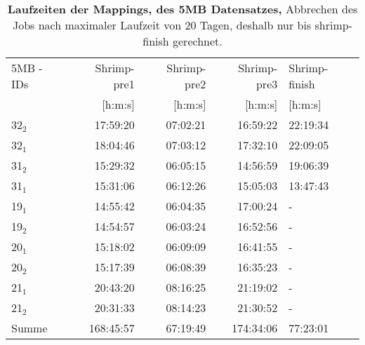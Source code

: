 \documentclass{scrartcl}
\begin{document}
\begin{table}[!h]
\caption[Laufzeiten der Mappings, des 5MB Datensatzes]{\textbf{Laufzeiten der Mappings, des 5MB Datensatzes,} Abbrechen des Jobs nach maximaler Laufzeit von 20 Tagen, deshalb nur bis shrimp-finish gerechnet.}

\begin{center}
\begin{tabular}{lrrrl}
5MB - IDs & Shrimp-pre1 & Shrimp-pre2 & Shrimp-pre3 & Shrimp-finish\\
 & [h:m:s] & [h:m:s] & [h:m:s] & [h:m:s]\\
\hline
32$_{\text{2}}$ & 17:59:20 & 07:02:21 & 16:59:22 & 22:19:34\\
32$_{\text{1}}$ & 18:04:46 & 07:03:12 & 17:32:10 & 22:09:05\\
31$_{\text{2}}$ & 15:29:32 & 06:05:15 & 14:56:59 & 19:06:39\\
31$_{\text{1}}$ & 15:31:06 & 06:12:26 & 15:05:03 & 13:47:43\\
19$_{\text{1}}$ & 14:55:42 & 06:04:35 & 17:00:24 & -\\
19$_{\text{2}}$ & 14:54:57 & 06:03:24 & 16:52:56 & -\\
20$_{\text{1}}$ & 15:18:02 & 06:09:09 & 16:41:55 & -\\
20$_{\text{2}}$ & 15:17:39 & 06:08:39 & 16:35:23 & -\\
21$_{\text{1}}$ & 20:43:20 & 08:16:25 & 21:19:02 & -\\
21$_{\text{2}}$ & 20:31:33 & 08:14:23 & 21:30:52 & -\\
Summe & 168:45:57 & 67:19:49 & 174:34:06 & 77:23:01\\
\end{tabular}
\end{center}
\end{table}
\end{document}
